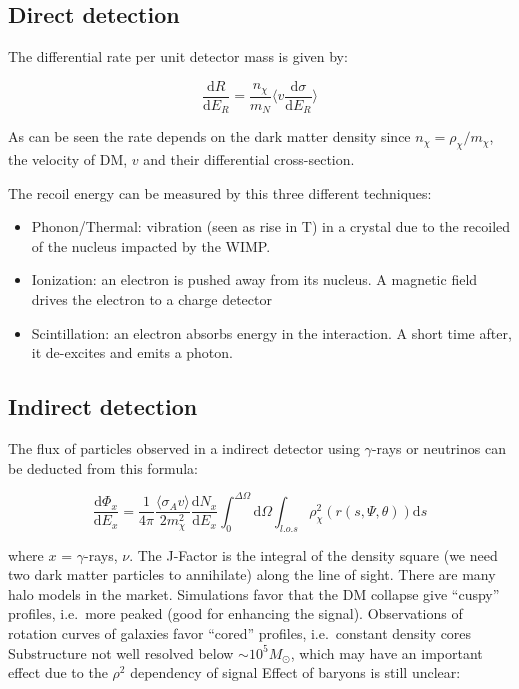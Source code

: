 \documentclass[
  letterpaper,
  DIV=11,
  numbers=noendperiod]{scrreprt}
\providecommand{\tightlist}{%
  \setlength{\itemsep}{0pt}\setlength{\parskip}{0pt}}\usepackage{longtable,booktabs,array}
\begin{document}
\subsection{Direct detection}\label{direct-detection}

The differential rate per unit detector mass is given by:

\[\frac{\mathrm{d}R}{\mathrm{d} E_R} = \frac{n_\chi}{m_N} \Biggl\langle v \frac{\mathrm{d}\sigma}{\mathrm{d}E_R}\Biggr\rangle\]

As can be seen the rate depends on the dark matter density since
\(n_\chi = \rho_\chi/m_\chi\), the velocity of DM, \(v\) and their
differential cross-section.

The recoil energy can be measured by this three different techniques:

\begin{itemize}
\tightlist
\item
  Phonon/Thermal: vibration (seen as rise in T) in a crystal due to the
  recoiled of the nucleus impacted by the WIMP.
\item
  Ionization: an electron is pushed away from its nucleus. A magnetic
  field drives the electron to a charge detector
\item
  Scintillation: an electron absorbs energy in the interaction. A short
  time after, it de-excites and emits a photon.
\end{itemize}

\subsection{Indirect detection}\label{indirect-detection}

The flux of particles observed in a indirect detector using
\(\gamma\)-rays or neutrinos can be deducted from this formula:

\[\frac{\mathrm{d}\Phi_x}{\mathrm{d}E_x} = \frac{1}{4\pi} \frac{\langle \sigma_A v \rangle}{2m_\chi^2} \frac{\mathrm{d} N_x}{\mathrm{d}E_x} \int_0^{\Delta \Omega} \mathrm{d} \Omega \int_{l.o.s} \rho_\chi^2(r(s,\Psi, \theta)) \mathrm{d} s\]

where \(x\) = \(\gamma\)-rays, \(\nu\). The J-Factor is the integral of
the density square (we need two dark matter particles to annihilate)
along the line of sight. There are many halo models in the market.
Simulations favor that the DM collapse give ``cuspy'' profiles,
i.e.~more peaked (good for enhancing the signal). Observations of
rotation curves of galaxies favor ``cored'' profiles, i.e.~constant
density cores Substructure not well resolved below
\(\sim 10^5 M_\odot\), which may have an important effect due to the
\(\rho^2\) dependency of signal Effect of baryons is still unclear:
\end{document}
